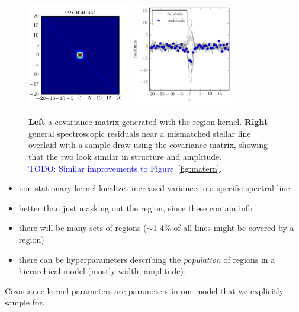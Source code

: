 \documentclass[iop,floatfix]{emulateapj}
\newcommand{\todo}[1]{ \textcolor{Blue}{\\TODO: #1}}
\begin{document}
\begin{figure}[!htb]
\begin{center}
\includegraphics[width=0.4\textwidth]{figs/matrix_region_covariance}
\includegraphics[width=0.4\textwidth]{figs/random_draw}
\caption{\textbf{Left} a covariance matrix generated with the region kernel.
\textbf{Right} general spectroscopic residuals near a mismatched stellar line
 overlaid with a sample draw using the covariance matrix, showing that the two
 look similar in structure and amplitude. 
\protect \todo{Similar improvements to
  Figure~\ref{fig:matern}.}}
\label{fig:region}
\end{center}
\end{figure}

\begin{itemize}
  \item non-stationary kernel localizes increased variance to a specific
    spectral line
  \item better than just masking out the region, since these contain info
  \item there will be many sets of regions ($\sim$1-4\% of all lines might be
    covered by a region)
  \item there can be hyperparameters describing the \emph{population} of
    regions in a hierarchical model (mostly width, amplitude).
\end{itemize}

Covariance kernel parameters are parameters in our model that we explicitly
 sample for. 
\end{document}
